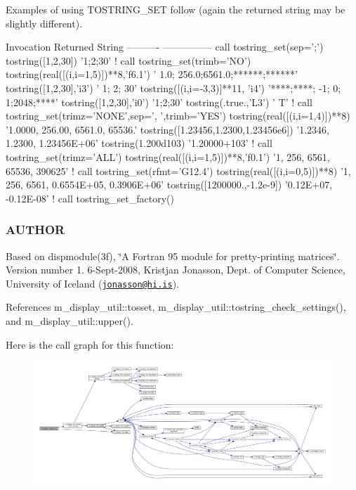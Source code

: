 Examples of using T\+O\+S\+T\+R\+I\+N\+G\+\_\+\+S\+ET follow (again the returned string may be slightly different). \begin{DoxyVerb}  Invocation                              Returned String
  ----------                              ---------------
  call tostring_set(sep=';')
  tostring([1,2,30])                      '1;2;30'
  !
  call tostring_set(trimb='NO')
  tostring(real([(i,i=1,5)])**8,'f6.1')   '   1.0; 256.0;6561.0;******;******'
  tostring([1,2,30],'i3')                 '  1;  2; 30'
  tostring([(i,i=-3,3)]**11, 'i4')        '****;****;  -1;   0;   1;2048;****'
  tostring([1,2,30],'i0')                 '1;2;30'
  tostring(.true.,'L3')                   '  T'
  !
  call tostring_set(trimz='NONE',sep=', ',trimb='YES')
  tostring(real([(i,i=1,4)])**8)          '1.0000, 256.00, 6561.0, 65536.'
  tostring([1.23456,1.2300,1.23456e6])    '1.2346, 1.2300, 1.23456E+06'
  tostring(1.200d103)                     '1.20000+103'
  !
  call tostring_set(trimz='ALL')
  tostring(real([(i,i=1,5)])**8,'f0.1')   '1, 256, 6561, 65536, 390625'
  !
  call tostring_set(rfmt='G12.4')
  tostring(real([(i,i=0,5)])**8)          '1, 256, 6561, 0.6554E+05, 0.3906E+06'
  tostring([1200000.,-1.2e-9])            '0.12E+07, -0.12E-08'
  !
  call tostring_set_factory()
\end{DoxyVerb}


\subsubsection*{A\+U\+T\+H\+OR}

Based on dispmodule(3f), \char`\"{}\+A Fortran 95 module for pretty-\/printing matrices\char`\"{}. Version number 1. 6-\/\+Sept-\/2008, Kristjan Jonasson, Dept. of Computer Science, University of Iceland (\href{mailto:jonasson@hi.is}{\tt jonasson@hi.\+is}). 

References m\+\_\+display\+\_\+util\+::tosset, m\+\_\+display\+\_\+util\+::tostring\+\_\+check\+\_\+settings(), and m\+\_\+display\+\_\+util\+::upper().

Here is the call graph for this function\+:
\nopagebreak
\begin{figure}[H]
\begin{center}
\leavevmode
\includegraphics[width=350pt]{namespacem__display_ac6d80df8c70bb7d64df528d26851d6cb_cgraph}
\end{center}
\end{figure}
\mbox{\label{namespacem__display_abf51a5db397d27e0c6cb39e9f3fa7e24}} 
